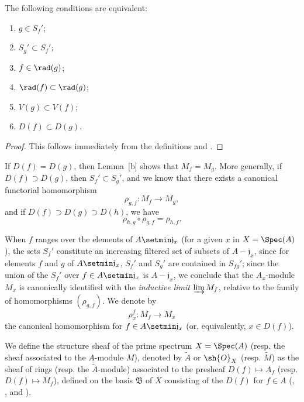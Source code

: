 \begin{lemma}[1.3.2]
\label{I.1.3.2}
The following conditions are equivalent:
\begin{enumerate}
  \item[{\rm(a)}] $g\in S_f'$;
  \item[{\rm(b)}] $S_g'\subset S_f'$;
  \item[{\rm(c)}] $f\in\rad(g)$;
  \item[{\rm(d)}] $\rad(f)\subset\rad(g)$;
  \item[{\rm(e)}] $V(g)\subset V(f)$;
  \item[{\rm(f)}] $D(f)\subset D(g)$.
\end{enumerate}
\end{lemma}

\begin{proof}
This follows immediately from the definitions and .
\end{proof}

\begin{env}[1.3.3]
\label{I.1.3.3}
If $D(f)=D(g)$, then Lemma~[b] shows that $M_f=M_g$.
More generally, if $D(f)\supset D(g)$, then $S_f'\subset S_g'$, and we know  that there exists a canonical functorial homomorphism
\[
  \rho_{g,f}:M_f\to M_g,
\]
and if $D(f)\supset D(g)\supset D(h)$, we have 
\[
  \rho_{h,g}\circ\rho_{g,f}=\rho_{h,f}.
  \tag{1.3.3.1}
  \label{I.1.3.3.1}
\]
\end{env}

When $f$ ranges over the elements of $A\setmin\mathfrak{j}_x$ (for a given $x$ in $X=\Spec(A)$), the sets $S_f'$ constitute an increasing filtered set of subsets of $A-\mathfrak{j}_x$, since for elements $f$ and $g$ of $A\setmin\mathfrak{j}_x$, $S_f'$ and $S_g'$ are contained in $S_{fg}'$;
since the union of the $S_f'$ over $f\in A\setmin\mathfrak{j}_x$ is $A-\mathfrak{j}_x$, we conclude  that the $A_x$-module $M_x$ is canonically identified with the \emph{inductive limit} $\varinjlim M_f$, relative to the family of homomorphisms $(\rho_{g,f})$.
We denote by
\[
  \rho_x^f:M_f\to M_x
\]
the canonical homomorphism for $f\in A\setmin\mathfrak{j}_x$ (or, equivalently, $x\in D(f)$).

\begin{definition}[1.3.4]
\label{I.1.3.4}
We define the structure sheaf of the prime spectrum $X=\Spec(A)$ (resp. the sheaf associated to the $A$-module $M$), denoted by $\widetilde{A}$ or $\sh{O}_X$ (resp. $\widetilde{M}$) as the sheaf of rings (resp. the $\widetilde{A}$-module) associated to the presheaf $D(f)\mapsto A_f$ (resp. $D(f)\mapsto M_f$), defined on the basis $\mathfrak{B}$ of $X$ consisting of the $D(f)$ for $f\in A$ (, , and ).
\end{definition}

